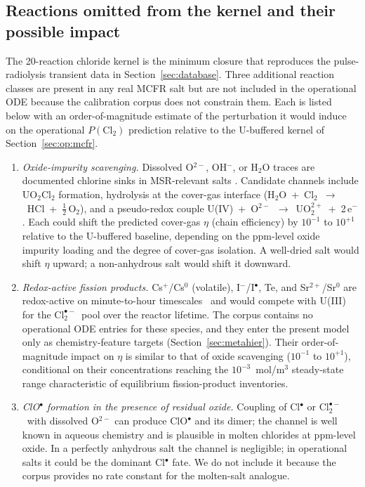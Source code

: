 \documentclass[11pt]{article}
\theoremstyle{plain}
\theoremstyle{definition}
\theoremstyle{remark}
\newcommand{\Clt}{\ensuremath{\mathrm{Cl}_2^{\bullet-}}\xspace}
\begin{document}
\subsection{Reactions omitted from the kernel and their possible impact}
\label{sec:cl:omitted}

The 20-reaction chloride kernel is the minimum closure that reproduces the
pulse-radiolysis transient data in Section~\ref{sec:database}.  Three
additional reaction classes are present in any real MCFR salt but are not
included in the operational ODE because the calibration corpus does not
constrain them.  Each is listed below with an order-of-magnitude estimate
of the perturbation it would induce on the operational $P(\mathrm{Cl}_2)$
prediction relative to the U-buffered kernel of
Section~\ref{sec:op:mcfr}.

\begin{enumerate}
\item \emph{Oxide-impurity scavenging.}  Dissolved O$^{2-}$, OH$^-$, or
      H$_2$O traces are documented chlorine sinks in MSR-relevant salts
      \citep{ForsbergSafety2019,Sims2020Ce}.  Candidate channels include
      UO$_2$Cl$_2$ formation, hydrolysis at the cover-gas interface
      (H$_2$O~+~Cl$_2$~$\to$~HCl~+~$\tfrac12$\,O$_2$), and a pseudo-redox
      couple U(IV)~+~O$^{2-}$~$\to$~UO$_2^{2+}$~+~2\,e$^-$.  Each could
      shift the predicted cover-gas $\eta$ (chain efficiency) by
      $10^{-1}$ to $10^{+1}$ relative to the U-buffered baseline,
      depending on the ppm-level oxide impurity loading and the degree
      of cover-gas isolation.  A well-dried salt would shift $\eta$
      upward; a non-anhydrous salt would shift it downward.
\item \emph{Redox-active fission products.}  Cs$^+$/Cs$^0$ (volatile),
      I$^-$/I$^{\bullet}$, Te, and Sr$^{2+}$/Sr$^0$ are redox-active on
      minute-to-hour timescales~\citep{Briggs1964,Sims2020Ce} and would
      compete with U(III) for the \Clt\ pool over the reactor lifetime.
      The corpus contains no operational ODE entries for these species,
      and they enter the present model only as chemistry-feature targets
      (Section~\ref{sec:metahier}).  Their order-of-magnitude impact on
      $\eta$ is similar to that of oxide scavenging
      ($10^{-1}$ to $10^{+1}$), conditional on their concentrations
      reaching the $10^{-3}$~mol/m$^3$ steady-state range characteristic
      of equilibrium fission-product inventories.
\item \emph{ClO$^\bullet$ formation in the presence of residual oxide.}
      Coupling of Cl$^{\bullet}$ or \Clt\ with dissolved O$^{2-}$ can
      produce ClO$^{\bullet}$ and its dimer; the channel is well known
      in aqueous chemistry and is plausible in molten chlorides at
      ppm-level oxide.  In a perfectly anhydrous salt the channel is
      negligible; in operational salts it could be the dominant
      Cl$^{\bullet}$ fate.  We do not include it because the corpus
      provides no rate constant for the molten-salt analogue.
\end{enumerate}
\end{document}

